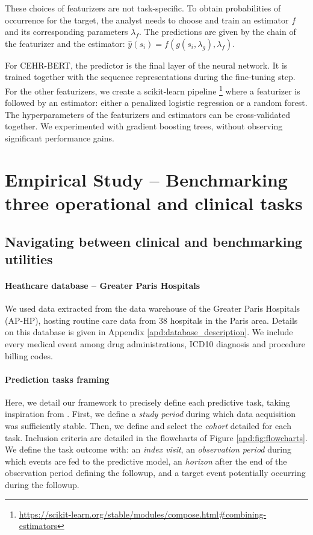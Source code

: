 \documentclass[french,12pt,twoside,a4paper]{book}
\begin{document}
These choices of featurizers are not task-specific. To obtain probabilities of
occurrence for the target, the analyst needs to choose and train an estimator $f$
and its corresponding parameters $\lambda_f$. The predictions are given by the chain of the featurizer and the
estimator: $\hat{y}(s_i) = f(g(s_i, \lambda_g), \lambda_f)$.

For CEHR-BERT, the predictor is the final layer of the neural network. It is
trained together with the sequence representations during the fine-tuning step.
For the other featurizers, we create a scikit-learn pipeline
\footnote{\url{https://scikit-learn.org/stable/modules/compose.html\#combining-estimators}}
where a featurizer is followed by an estimator: either a penalized logistic
regression or a random forest. The hyperparameters of the featurizers and
estimators can be cross-validated together. %
We experimented with gradient boosting trees, without observing significant performance gains.


\section{Empirical Study -- Benchmarking three operational and clinical
  tasks}\label{sec:predictive_models:empirical_study}

\subsection{Navigating between clinical and benchmarking utilities}%
\label{subsec:predictive_models:task_definitions}%

\paragraph{Heathcare database -- Greater Paris Hospitals}%
\label{sec:data_extraction}%

We used data extracted from the data warehouse of the Greater Paris Hospitals
(AP-HP), hosting routine care data from 38 hospitals in the Paris area. Details
on this database is given in Appendix \ref{apd:database_description}. We include
every medical event among drug administrations, ICD10 diagnosis and procedure
billing codes.

\paragraph{Prediction tasks framing} Here, we detail our framework to precisely
define each predictive task, taking inspiration from
\cite{ohdsi2019book,tomavsev2021use}. First, we define a \emph{study period}
during which data acquisition was sufficiently stable. Then, we define and
select the \emph{cohort} detailed for each task. Inclusion criteria are detailed
in the flowcharts of Figure \ref{apd:fig:flowcharts}. We define the task outcome
with: an \emph{index visit}, an \emph{observation period} during which events
are fed to the predictive model, an \emph{horizon} after the end of the
observation period defining the followup, and a target event potentially
occurring during the followup.
\end{document}
